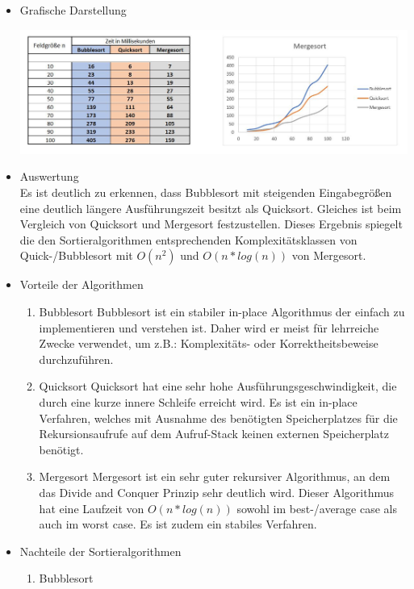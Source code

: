 	\begin{itemize}
		\item Grafische Darstellung \\
		\begin{center}
			\includegraphics[width=1\textwidth]{src/Daten_Sortieralgorithmen.jpg}
		\end{center}
		\item Auswertung \\
		Es ist deutlich zu erkennen, dass Bubblesort mit steigenden Eingabegrößen eine deutlich längere Ausführungszeit besitzt als Quicksort. Gleiches ist beim Vergleich von Quicksort und Mergesort festzustellen. Dieses Ergebnis spiegelt die den Sortieralgorithmen entsprechenden Komplexitätsklassen von Quick-/Bubblesort mit $O(n^2)$ und $O(n*log(n))$ von Mergesort. 
		\item Vorteile der Algorithmen
			\begin{enumerate}
				\item Bubblesort
					Bubblesort ist ein stabiler in-place Algorithmus der einfach zu implementieren und verstehen ist. Daher wird er meist für lehrreiche Zwecke verwendet, um z.B.: Komplexitäts- oder Korrektheitsbeweise durchzuführen.
				\item Quicksort
					Quicksort hat eine sehr hohe Ausführungsgeschwindigkeit, die durch eine kurze innere Schleife erreicht wird. Es ist ein in-place Verfahren, welches mit Ausnahme des benötigten Speicherplatzes für die Rekursionsaufrufe auf dem Aufruf-Stack keinen externen Speicherplatz benötigt. 
				\item Mergesort
				Mergesort ist ein sehr guter rekursiver Algorithmus, an dem das Divide and Conquer Prinzip sehr deutlich wird. Dieser Algorithmus hat eine Laufzeit von $O(n*log(n))$ sowohl im best-/average case als auch im worst case. Es ist zudem ein stabiles Verfahren. 
			\end{enumerate}
		\item Nachteile der Sortieralgorithmen
			\begin{enumerate}
				\item Bubblesort

\end{enumerate}
\end{itemize}
